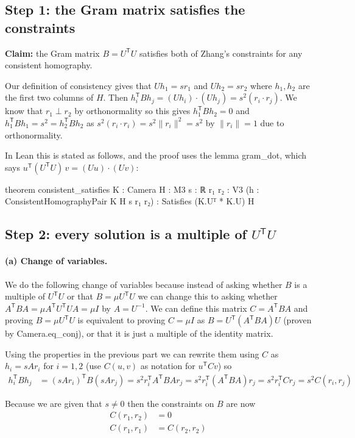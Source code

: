 \documentclass[10pt]{article}
\theoremstyle{plain}
\theoremstyle{definition}
\theoremstyle{remark}
\newcommand{\T}{^{\mathsf{T}}}
\newcommand{\lean}[1]{{\ttfamily\let\us\_\def\_{\us\allowbreak}#1}}
\begin{document}
\subsection{Step 1: the Gram matrix satisfies the constraints}
\textbf{Claim:} the Gram matrix $B=U\T U$ satisfies both of Zhang's constraints for any consistent homography.

Our definition of consistency gives that $Uh_1=sr_1$ and $Uh_2=sr_2$ where $h_1, h_2$ are the first two columns of $H$. Then $h_i\T Bh_j=(Uh_i) \cdot (Uh_j)=s^2(r_i \cdot r_j)$. We know that $r_1 \perp r_2$ by orthonormality so this gives $h_1\T Bh_2=0$ and $h_1\T Bh_1=s^2=h_2\T Bh_2$ as $s^2(r_i \cdot r_i)=s^2\|r_i\|^2=s^2$ by $\|r_i\|=1$ due to orthonormality.

In Lean this is stated as follows, and the proof uses the lemma
\lean{gram\_dot}, which says $u\T (U\T U)\, v = (Uu)\cdot(Uv)$:
\begin{leancode}
theorem consistent_satisfies {K : Camera} {H : M3} {s : ℝ} {r₁ r₂ : V3}
    (h : ConsistentHomographyPair K H s r₁ r₂) : Satisfies (K.Uᵀ * K.U) H
\end{leancode}

\subsection{Step 2: every solution is a multiple of \texorpdfstring{$U\T U$}{U^T U}}

\paragraph{(a) Change of variables.}
We do the following change of variables because instead of asking whether $B$ is a multiple of $U\T U$ or that $B=\mu U\T U$ we can change this to asking whether $A\T BA=\mu A\T U\T UA=\mu I$ by $A=U^{-1}$. We can define this matrix $C=A\T BA$ and proving $B=\mu U\T U$ is equivalent to proving $C=\mu I$ as $B=U\T (A\T BA)U$ (proven by \lean{Camera.eq\_conj}), or that it is just a multiple of the identity matrix.

Using the properties in the previous part we can rewrite them using $C$ as $h_i=sAr_i$ for $i=1,2$ (use $C(u,v)$ as notation for $u\T Cv$) so
\begin{align*}
    h_i\T Bh_j &=(sAr_i)\T B(sAr_j) = s^2r_i\T A\T BAr_j=s^2r_i\T (A\T BA)r_j=s^2r_i\T Cr_j=s^2C(r_i, r_j)
\end{align*}

Because we are given that $s \neq 0$ then the constraints on $B$ are now
\begin{align*}
    C(r_1, r_2) &= 0 \\
    C(r_1, r_1) &= C(r_2, r_2)
\end{align*}
\end{document}
